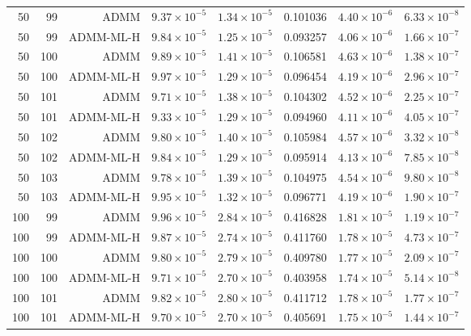 \begin{longtable}{rrrrrrrr}
\midrule
50 & 99 & ADMM & $9.37\times 10^{-5}$ & $1.34\times 10^{-5}$ & 0.101036 & $4.40\times 10^{-6}$ & $6.33\times 10^{-8}$ \\
50 & 99 & ADMM-ML-H & $9.84\times 10^{-5}$ & $1.25\times 10^{-5}$ & 0.093257 & $4.06\times 10^{-6}$ & $1.66\times 10^{-7}$ \\
\midrule
50 & 100 & ADMM & $9.89\times 10^{-5}$ & $1.41\times 10^{-5}$ & 0.106581 & $4.63\times 10^{-6}$ & $1.38\times 10^{-7}$ \\
50 & 100 & ADMM-ML-H & $9.97\times 10^{-5}$ & $1.29\times 10^{-5}$ & 0.096454 & $4.19\times 10^{-6}$ & $2.96\times 10^{-7}$ \\
\midrule
50 & 101 & ADMM & $9.71\times 10^{-5}$ & $1.38\times 10^{-5}$ & 0.104302 & $4.52\times 10^{-6}$ & $2.25\times 10^{-7}$ \\
50 & 101 & ADMM-ML-H & $9.33\times 10^{-5}$ & $1.29\times 10^{-5}$ & 0.094960 & $4.11\times 10^{-6}$ & $4.05\times 10^{-7}$ \\
\midrule
50 & 102 & ADMM & $9.80\times 10^{-5}$ & $1.40\times 10^{-5}$ & 0.105984 & $4.57\times 10^{-6}$ & $3.32\times 10^{-8}$ \\
50 & 102 & ADMM-ML-H & $9.84\times 10^{-5}$ & $1.29\times 10^{-5}$ & 0.095914 & $4.13\times 10^{-6}$ & $7.85\times 10^{-8}$ \\
\midrule
50 & 103 & ADMM & $9.78\times 10^{-5}$ & $1.39\times 10^{-5}$ & 0.104975 & $4.54\times 10^{-6}$ & $9.80\times 10^{-8}$ \\
50 & 103 & ADMM-ML-H & $9.95\times 10^{-5}$ & $1.32\times 10^{-5}$ & 0.096771 & $4.19\times 10^{-6}$ & $1.90\times 10^{-7}$ \\
\midrule
100 & 99 & ADMM & $9.96\times 10^{-5}$ & $2.84\times 10^{-5}$ & 0.416828 & $1.81\times 10^{-5}$ & $1.19\times 10^{-7}$ \\
100 & 99 & ADMM-ML-H & $9.87\times 10^{-5}$ & $2.74\times 10^{-5}$ & 0.411760 & $1.78\times 10^{-5}$ & $4.73\times 10^{-7}$ \\
\midrule
100 & 100 & ADMM & $9.80\times 10^{-5}$ & $2.79\times 10^{-5}$ & 0.409780 & $1.77\times 10^{-5}$ & $2.09\times 10^{-7}$ \\
100 & 100 & ADMM-ML-H & $9.71\times 10^{-5}$ & $2.70\times 10^{-5}$ & 0.403958 & $1.74\times 10^{-5}$ & $5.14\times 10^{-8}$ \\
\midrule
100 & 101 & ADMM & $9.82\times 10^{-5}$ & $2.80\times 10^{-5}$ & 0.411712 & $1.78\times 10^{-5}$ & $1.77\times 10^{-7}$ \\
100 & 101 & ADMM-ML-H & $9.70\times 10^{-5}$ & $2.70\times 10^{-5}$ & 0.405691 & $1.75\times 10^{-5}$ & $1.44\times 10^{-7}$ \\

\end{longtable}
